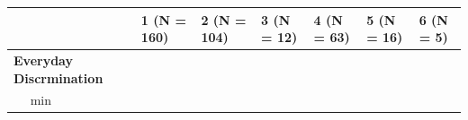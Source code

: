 \documentclass[
  english,
  man,floatsintext]{apa6}
\begin{document}
\begin{longtable}[]{@{}lllllll@{}}
\toprule
\begin{minipage}[b]{0.16\columnwidth}\raggedright
\strut
\end{minipage} & \begin{minipage}[b]{0.11\columnwidth}\raggedright
1 (N = 160)\strut
\end{minipage} & \begin{minipage}[b]{0.11\columnwidth}\raggedright
2 (N = 104)\strut
\end{minipage} & \begin{minipage}[b]{0.11\columnwidth}\raggedright
3 (N = 12)\strut
\end{minipage} & \begin{minipage}[b]{0.11\columnwidth}\raggedright
4 (N = 63)\strut
\end{minipage} & \begin{minipage}[b]{0.11\columnwidth}\raggedright
5 (N = 16)\strut
\end{minipage} & \begin{minipage}[b]{0.11\columnwidth}\raggedright
6 (N = 5)\strut
\end{minipage}\tabularnewline
\midrule
\endhead
\begin{minipage}[t]{0.16\columnwidth}\raggedright
\textbf{Everyday Discrmination}\strut
\end{minipage} & \begin{minipage}[t]{0.11\columnwidth}\raggedright
~~\strut
\end{minipage} & \begin{minipage}[t]{0.11\columnwidth}\raggedright
~~\strut
\end{minipage} & \begin{minipage}[t]{0.11\columnwidth}\raggedright
~~\strut
\end{minipage} & \begin{minipage}[t]{0.11\columnwidth}\raggedright
~~\strut
\end{minipage} & \begin{minipage}[t]{0.11\columnwidth}\raggedright
~~\strut
\end{minipage} & \begin{minipage}[t]{0.11\columnwidth}\raggedright
~~\strut
\end{minipage}\tabularnewline
\begin{minipage}[t]{0.16\columnwidth}\raggedright
~~ min\strut
\end{minipage} & \begin{minipage}[t]{0.11\columnwidth}\raggedright

\end{minipage}
\end{longtable}
\end{document}
